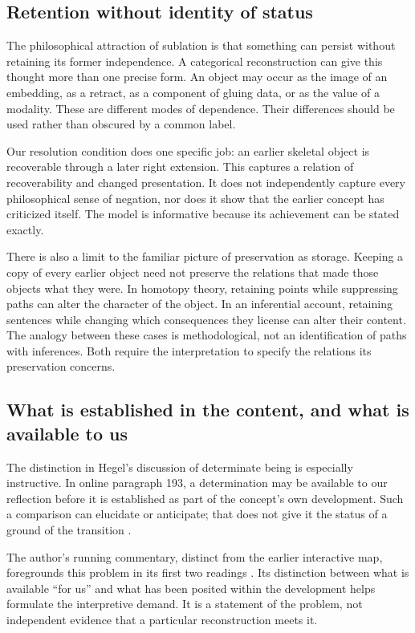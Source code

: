 \subsection{Retention without identity of status}

The philosophical attraction of sublation is that something can persist
without retaining its former independence. A categorical reconstruction can
give this thought more than one precise form. An object may occur as the
image of an embedding, as a retract, as a component of gluing data, or as
the value of a modality. These are different modes of dependence. Their
differences should be used rather than obscured by a common label.

Our resolution condition does one specific job: an earlier skeletal object
is recoverable through a later right extension. This captures a relation of
recoverability and changed presentation. It does not independently capture
every philosophical sense of negation, nor does it show that the earlier
concept has criticized itself. The model is informative because its
achievement can be stated exactly.

There is also a limit to the familiar picture of preservation as storage.
Keeping a copy of every earlier object need not preserve the relations
that made those objects what they were. In homotopy theory, retaining points
while suppressing paths can alter the character of the object. In an
inferential account, retaining sentences while changing which consequences
they license can alter their content. The analogy between these cases is
methodological, not an identification of paths with inferences. Both require
the interpretation to specify the relations its preservation concerns.

\subsection{What is established in the content, and what is available to us}

The distinction in Hegel's discussion of determinate being is especially
instructive. In online paragraph 193, a determination may be available to
our reflection before it is established as part of the concept's own
development. Such a comparison can elucidate or anticipate; that does not
give it the status of a ground of the transition \cite{HegelDasein}.

The author's running commentary, distinct from the earlier interactive
map, foregrounds this problem in its first two readings
\cite{AutioCommentary}. Its distinction between what is available
``for us'' and what has been posited within the development helps formulate
the interpretive demand. It is a statement of the problem, not independent
evidence that a particular reconstruction meets it.

